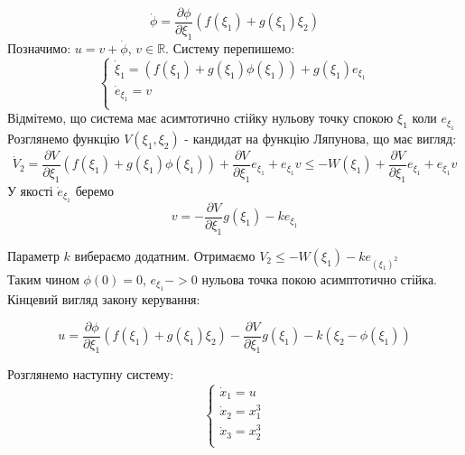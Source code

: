 \documentclass{article}
\begin{document}
\begin{equation}
    \dot\phi = \frac{\partial \phi}{\partial \xi_1}(f(\xi_1)+g(\xi_1)\xi_2)
\end{equation}
Позначимо: $u = v + \dot\phi$, $v \in \mathbb{R}$.
Систему перепишемо:
\begin{equation}
    \begin{cases}
        \dot \xi_1 = (f(\xi_1)+g(\xi_1)\phi(\xi_1))+g(\xi_1)e_{\xi_1}\\
        \dot e_{\xi_1} = v\\
    \end{cases}
\end{equation}
Відмітемо, що система має асимтотично стійку нульову точку спокою $\xi_1$ коли $e_{\xi_1}$
Розглянемо функцію $V(\xi_1,\xi_2)$ - кандидат на функцію Ляпунова, що має вигляд:
\begin{equation}
    \dot V_2 = \frac{\partial V}{\partial \xi_1}(f(\xi_1)+g(\xi_1)\phi(\xi_1))+
    \frac{\partial V}{\partial \xi_1}e_{\xi_1}+e_{\xi_1}v \leq -W(\xi_1)+
    \frac{\partial V}{\partial \xi_1}e_{\xi_1}+e_{\xi_1}v
\end{equation}
У якості $\dot e_{\xi_1}$ беремо 
\begin{equation}
    v = - \frac{\partial V}{\partial \xi_1}g(\xi_1) - ke_{\xi_1}
\end{equation}

Параметр $k$ вибераємо додатним.
Отримаємо $V_2 \leq -W(\xi_1) - ke_{(\xi_1)^2}$ \\
Таким чином $\phi(0)=0$, $e_{\xi_1} -> 0$ нульова точка покою асимптотично стійка.
Кінцевий вигляд закону керування:

\begin{equation}
    u = \frac{\partial \phi}{\partial \xi_1}(f(\xi_1)+g(\xi_1)\xi_2)-
    \frac{\partial V}{\partial \xi_1}g(\xi_1)-k(\xi_2-\phi(\xi_1))
\end{equation}
\pagebreak

Розглянемо наступну систему:
\begin{equation}
    \begin{cases}
    \dot x_1 = u \\
    \dot x_2 = x_1^3\\
    \dot x_3 = x_2^3\\
    \end{cases}
\end{equation}
\end{document}
